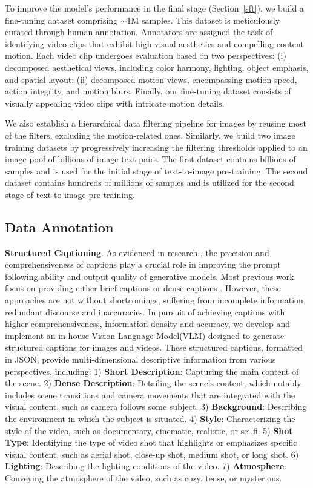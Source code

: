 To improve the model's performance in the final stage (Section~\ref{sft}), we build a fine-tuning dataset comprising $\sim$1M samples. This dataset is meticulously curated through human annotation. Annotators are assigned the task of identifying video clips that exhibit high visual aesthetics and compelling content motion. Each video clip undergoes evaluation based on two perspectives: (i) decomposed aesthetical views, including color harmony, lighting, object emphasis, and spatial layout; (ii) decomposed motion views, encompassing motion speed, action integrity, and motion blurs. Finally, our fine-tuning dataset consists of visually appealing video clips with intricate motion details.

We also establish a hierarchical data filtering pipeline for images by reusing most of the filters, excluding the motion-related ones. Similarly, we build two image training datasets by progressively increasing the filtering thresholds applied to an image pool of billions of image-text pairs. 
%
The first dataset contains billions of samples and is used for the initial stage of text-to-image pre-training. The second dataset contains hundreds of millions of samples and is utilized for the second stage of text-to-image pre-training.

\subsection{Data Annotation}

\textbf{Structured Captioning}. As evidenced in research \cite{videoworldsimulators2024,betker2023improving}, the precision and comprehensiveness of captions play a crucial role in improving the prompt following ability and output quality of generative models. Most previous work focus on providing either brief captions \cite{Chen_2024,li2022blip} or dense captions \cite{yang2024cogvideox,chen2023sharegpt4v,chen2024sharegpt4video}. However, these approaches are not without shortcomings, suffering from incomplete information, redundant discourse and inaccuracies. In pursuit of achieving captions with higher comprehensiveness, information density and accuracy, we develop and implement an in-house Vision Language Model(VLM) designed to generate structured captions for images and videos. These structured captions, formatted in JSON, provide multi-dimensional descriptive information from various perspectives, including: 1) \textbf{Short Description}: Capturing the main content of the scene. 2) \textbf{Dense Description}: Detailing the scene's content, which notably includes scene transitions and camera movements that are integrated with the visual content, such as camera follows some subject. 3) \textbf{Background}: Describing the environment in which the subject is situated. 4) \textbf{Style}: Characterizing the style of the video, such as documentary, cinematic, realistic, or sci-fi. 5) \textbf{Shot Type}: Identifying the type of video shot that highlights or emphasizes specific visual content, such as aerial shot, close-up shot, medium shot, or long shot. 6) \textbf{Lighting}: Describing the lighting conditions of the video. 7) \textbf{Atmosphere}: Conveying the atmosphere of the video, such as cozy, tense, or mysterious.

